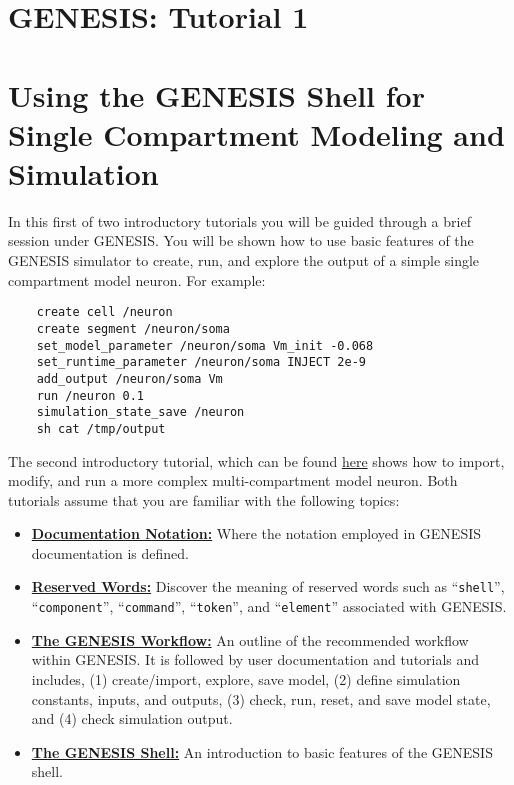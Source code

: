 \documentclass[12pt]{article}
\begin{document}
\section*{GENESIS: Tutorial 1}

\section*{Using the GENESIS Shell for\\Single Compartment Modeling and Simulation}

In this first of two introductory tutorials you will be guided through a brief session under GENESIS. You will be shown how to use basic features of the GENESIS simulator to create, run, and explore the output of a simple single compartment model neuron. For example:

\begin{verbatim}
    create cell /neuron
    create segment /neuron/soma
    set_model_parameter /neuron/soma Vm_init -0.068
    set_runtime_parameter /neuron/soma INJECT 2e-9
    add_output /neuron/soma Vm
    run /neuron 0.1
    simulation_state_save /neuron
    sh cat /tmp/output
\end{verbatim}
The second introductory tutorial, which can be found \href{../tutorial2/tutorial2.pdf}{here} shows how to import, modify, and run a more complex multi-compartment model neuron. Both tutorials assume that you are familiar with the following topics:

\begin{itemize}

\item \href{../genesis-document-notation/genesis-document-notation.pdf}{\bf Documentation Notation:} Where the notation employed in GENESIS documentation is defined.

\item \href{../genesis-reserved-words/genesis-reserved-words.pdf}{\bf Reserved Words:} Discover the meaning of reserved words such as ``{\tt shell}'', ``{\tt component}'', ``{\tt command}'', ``{\tt token}'', and ``{\tt element}'' associated with GENESIS.

\item \href{../genesis-workflow/genesis-workflow.pdf}{\bf The GENESIS Workflow:} An outline of the recommended workflow within GENESIS. It is followed by user documentation and tutorials and includes, (1) create/import, explore, save model, (2) define simulation constants, inputs, and outputs, (3) check, run, reset, and save model state, and (4) check simulation output.  

\item \href{../genesis-shell/genesis-shell.pdf}{\bf The GENESIS Shell:} An introduction to basic features of the GENESIS shell.

\end{itemize}
\end{document}
